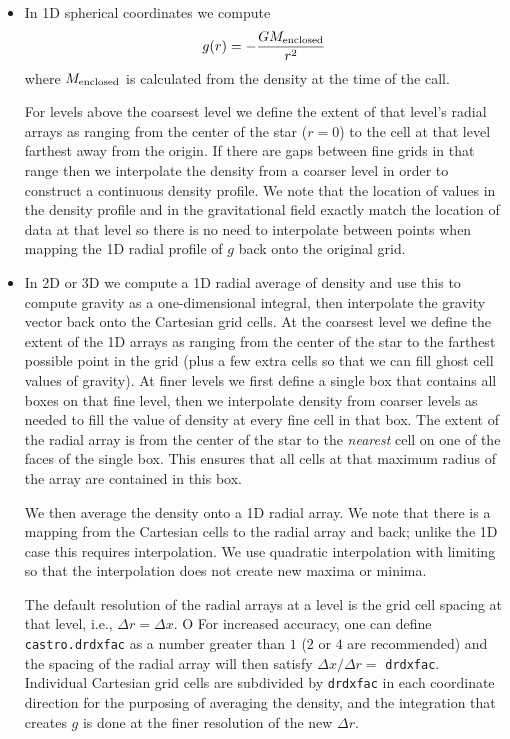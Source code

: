 \begin{itemize}

\item In 1D spherical coordinates we compute
  \begin{equation}
    g(r) = -\frac{G M_{\rm enclosed}}{ r^2}
  \end{equation}
  where $M_{\rm enclosed}$ is calculated from the density at the time
  of the call.  

  For levels above the coarsest level we define the extent of that
  level's radial arrays as ranging from the center of the star ($r=0$)
  to the cell at that level farthest away from the origin.  If there
  are gaps between fine grids in that range then we interpolate the
  density from a coarser level in order to construct a continuous
  density profile.  We note that the location of values in the density
  profile and in the gravitational field exactly match the location of
  data at that level so there is no need to interpolate between points
  when mapping the 1D radial profile of $g$ back onto the original
  grid.

\item In 2D or 3D we compute a 1D radial average of density and use
  this to compute gravity as a one-dimensional integral, then
  interpolate the gravity vector back onto the Cartesian grid
  cells. At the coarsest level we define the extent of the 1D arrays
  as ranging from the center of the star to the farthest possible
  point in the grid (plus a few extra cells so that we can fill ghost
  cell values of gravity).  At finer levels we first define a single
  box that contains all boxes on that fine level, then we interpolate
  density from coarser levels as needed to fill the value of density
  at every fine cell in that box.  The extent of the radial array is
  from the center of the star to the {\em nearest} cell on one of the
  faces of the single box.  This ensures that all cells at that
  maximum radius of the array are contained in this box.

We then average the density onto a 1D radial array.  We note that
there is a mapping from the Cartesian cells to the radial array and
back; unlike the 1D case this requires interpolation. We use quadratic
interpolation with limiting so that the interpolation does not create
new maxima or minima.

The default resolution of the radial arrays at a level is the grid
cell spacing at that level, i.e., $\Delta r = \Delta x$. O For
increased accuracy, one can define {\tt castro.drdxfac} as a number
greater than $1$ ($2$ or $4$ are recommended) and the spacing of the
radial array will then satisfy $\Delta x / \Delta r = $ {\tt drdxfac}.
Individual Cartesian grid cells are subdivided by {\tt drdxfac} in
each coordinate direction for the purposing of averaging the density,
and the integration that creates $g$ is done at the finer resolution
of the new $\Delta r$.


\end{itemize}
